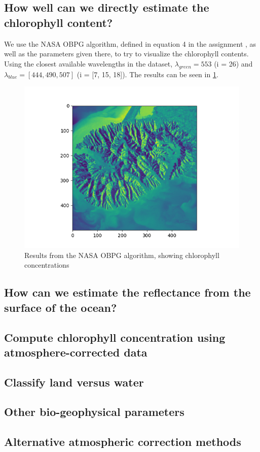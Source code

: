 \subsection{How well can we directly estimate the chlorophyll content?}

We use the NASA OBPG algorithm, defined in equation 4 in the assignment 
\cite{assignment}, as well as the parameters given there, to try to 
visualize the chlorophyll contents. Using the closest available wavelengths 
in the dataset, $\lambda_{green} = 553$ (i = 26) and $\lambda_{blue} = [444, 490, 507]$ 
(i = [7, 15, 18]). The results can be seen in \cref{fig:obpg}.

\begin{figure}
    \centering
    \includegraphics[width=\textwidth]{../fig/2b_nasa.png}
    \caption{Results from the NASA OBPG algorithm, showing chlorophyll concentrations}
    \label{fig:obpg}
\end{figure}

\subsection{How can we estimate the reflectance from the surface of the ocean?}

\subsection{Compute chlorophyll concentration using atmosphere-corrected data}

\subsection{Classify land versus water}

\subsection{Other bio-geophysical parameters}

\subsection{Alternative atmospheric correction methods}